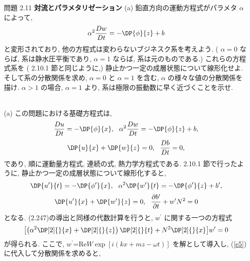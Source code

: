 \documentclass[a4j,12pt,openbib,oneside,dvipdfmx]{jsbook}
\def\theequation{\arabic{chapter}.\arabic{equation}}
\begin{document}
\begin{itembox}[l]{問題 2.11 {\bf 対流とパラメタリゼーション}}
\def\footnote{}
(a) 鉛直方向の運動方程式がパラメタ $\alpha$ によって, 
\begin{equation}
  {\alpha}^2{\frac{Dw}{Dt}}=-\DP{\phi}{z}+b
\end{equation}
と変形されており, 他の方程式は変わらないブジネスク系を考えよう. ( ${\alpha}=0$ ならば, 系は静水圧平衡であり, ${\alpha}=1$ ならば, 系は元のものである.) これらの方程式系を ( 2.10.1 節と同じように,) 静止かつ一定の成層状態について線形化せよ. そして系の分散関係を求め, ${\alpha}=0$ と ${\alpha}=1$ を含む, $\alpha$ の様々な値の分散関係を描け. ${\alpha}>1$ の場合, ${\alpha}=1$ より, 系は極限の振動数に早く近づくことを示せ. \\
\end{itembox}
\\
(a) この問題における基礎方程式は,
\def\theequation{A.\arabic{equation}}
\setcounter{equation}{0}
\begin{equation}
  {\frac{Du}{Dt}}=-\DP{\phi}{x}, \ \ 
  {\alpha}^2{\frac{Dw}{Dt}}=-\DP{\phi}{z}+b,
\end{equation}
\begin{equation}
  \DP{u}{x}+\DP{w}{z}=0, \ \ 
  {\frac{Db}{Dt}}=0,
\end{equation}
であり, 順に運動量方程式, 連続の式, 熱力学方程式である. 2.10.1 節で行ったように, 静止かつ一定の成層状態について線形化すると, 
\begin{equation}
  {\DP{u^{\prime}}{t}}=-\DP{\phi^{\prime}}{x}, \ \ 
  {\alpha}^2{\DP{w^{\prime}}{t}}=-\DP{\phi^{\prime}}{z}+b^{\prime},
\end{equation}
\begin{equation}
  \DP{u^{\prime}}{x}+\DP{w^{\prime}}{z}=0, \ \ 
  \frac{\partial b^{\prime}}{\partial t}+w^{\prime}N^2=0
\end{equation}
となる. (2.247)の導出と同様の代数計算を行うと, $w^{\prime}$ に関する一つの方程式
\begin{equation}
  {\left[\left({{\alpha}^2{\DP[2]{}{x}}+{\DP[2]{}{z}}}\right)\DP[2]{}{t}+N^2\DP[2]{}{x}\right]}w^{\prime}=0
  \label{e5}
\end{equation}
が得られる. ここで, $w^{\prime}$=\rm{Re}$W\exp{[i(kx+mz-{\omega}t)]}$ を解として導入し, (\ref{e5})に代入して分散関係を求めると, 
\end{document}
